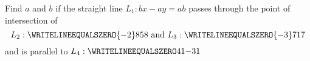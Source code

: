



\FRACMINUS\vd\ve\va\vb\tp\tq
\FRACMINUS\vf\ve\vc\vb\tr\ts
\FRACDIV\tr\ts\tp\tq\ixn\ixd %
\FRACL{-\va}{\vc}\ixn\ixd\iyn\iyd
\FRACDIV\iyn\iyd{}\iyn\iyd
\MULTIPLY\ixn\iyd\tp
\MULTIPLY{\ixd}\iyn\tq
\MULTIPLY\ixd\iyd\tr
\MULTIPLY\vg\tp\ga
\MULTIPLY\tr\vg\gb
\SUBTRACT\ga\tq\aq
\FRACDIV{}\aq\gb\bq\cq


\question[2] Find $a$ and $b$ if the straight line $L_1: bx - ay = ab$ passes through the point of intersection of 
\[ L_2: \WRITELINEEQUALSZERO{-\va}\vb\vc\vb\text{ and } L_3: \WRITELINEEQUALSZERO{-\vd}\ve\vf\ve\] 
and is parallel to $L_4: \WRITELINEEQUALSZERO\vg{1}{-\vh}{1}$

\watchout

